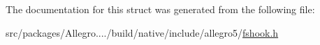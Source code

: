 The documentation for this struct was generated from the following file\+:\begin{DoxyCompactItemize}
\item 
src/packages/\+Allegro..../build/native/include/allegro5/\hyperlink{fshook_8h}{fshook.\+h}\end{DoxyCompactItemize}
